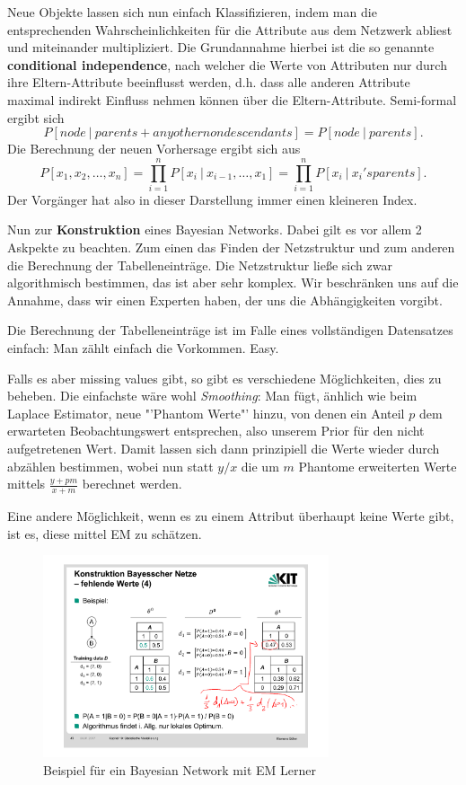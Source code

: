 Neue Objekte lassen sich nun einfach Klassifizieren, indem man die
entsprechenden Wahrscheinlichkeiten für die Attribute aus dem Netzwerk
abliest und miteinander multipliziert. Die Grundannahme hierbei ist 
die so genannte \textbf{conditional independence}, nach welcher die
Werte von Attributen nur durch ihre Eltern-Attribute beeinflusst werden,
d.h. dass alle anderen Attribute maximal indirekt Einfluss nehmen können
über die Eltern-Attribute. Semi-formal ergibt sich
\[P[node\ |\ parents + any other nondescendants] = P[node\ |\ parents].\]
Die Berechnung der neuen Vorhersage ergibt sich aus
\[P[x_1,x_2,\dots,x_n] = \prod_{i=1}^n P[x_i\ |\ x_{i-1},\dots,x_1]
= \prod_{i=1}^n P[x_i\ |\ x_i 's parents].\]
Der Vorgänger hat also in dieser Darstellung immer einen kleineren Index.


Nun zur \textbf{Konstruktion} eines Bayesian Networks. Dabei gilt 
es vor allem 2 Askpekte zu beachten. Zum einen das Finden der
Netzstruktur und zum anderen die Berechnung der Tabelleneinträge.
Die Netzstruktur ließe sich zwar algorithmisch bestimmen, das ist
aber sehr komplex. Wir beschränken uns auf die Annahme, dass wir
einen Experten haben, der uns die Abhängigkeiten vorgibt.

Die Berechnung der Tabelleneinträge ist im Falle eines vollständigen
Datensatzes einfach: Man zählt einfach die Vorkommen. Easy.

Falls es aber missing values gibt, so gibt es verschiedene Möglichkeiten,
dies zu beheben. Die einfachste wäre wohl \textit{Smoothing}: Man
fügt, änhlich wie beim Laplace Estimator, neue "'Phantom Werte"' hinzu,
von denen ein Anteil \(p\) dem erwarteten Beobachtungswert
entsprechen, also unserem Prior für den nicht aufgetretenen Wert.
Damit lassen sich dann prinzipiell die Werte wieder durch abzählen
bestimmen, wobei nun statt \(y/x\) die um \(m\) Phantome erweiterten
Werte mittels \(\frac{y+pm}{x+m}\) berechnet werden.

Eine andere Möglichkeit, wenn es zu einem Attribut überhaupt keine
Werte gibt, ist es, diese mittel EM zu schätzen.

\begin{figure}[htbp]
	\centering
	\includegraphics[width=0.75\textwidth]{Figures/BNEM}
	\caption[BN EM Beispiel]{Beispiel für ein Bayesian Network mit EM Lerner \footnotemark}
	\label{fig:bnem}
\end{figure}

